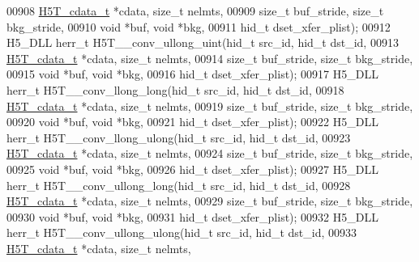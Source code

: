 \begin{DoxyCode}
00908                    \hyperlink{struct_h5_t__cdata__t}{H5T\_cdata\_t} *cdata, \textcolor{keywordtype}{size\_t} nelmts,
00909                    \textcolor{keywordtype}{size\_t} buf\_stride, \textcolor{keywordtype}{size\_t} bkg\_stride,
00910                                    \textcolor{keywordtype}{void} *buf, \textcolor{keywordtype}{void} *bkg,
00911                                    hid\_t dset\_xfer\_plist);
00912 H5\_DLL herr\_t H5T\_\_conv\_ullong\_uint(hid\_t src\_id, hid\_t dst\_id,
00913                     \hyperlink{struct_h5_t__cdata__t}{H5T\_cdata\_t} *cdata, \textcolor{keywordtype}{size\_t} nelmts,
00914                     \textcolor{keywordtype}{size\_t} buf\_stride, \textcolor{keywordtype}{size\_t} bkg\_stride,
00915                                     \textcolor{keywordtype}{void} *buf, \textcolor{keywordtype}{void} *bkg,
00916                                     hid\_t dset\_xfer\_plist);
00917 H5\_DLL herr\_t H5T\_\_conv\_llong\_long(hid\_t src\_id, hid\_t dst\_id,
00918                    \hyperlink{struct_h5_t__cdata__t}{H5T\_cdata\_t} *cdata, \textcolor{keywordtype}{size\_t} nelmts,
00919                    \textcolor{keywordtype}{size\_t} buf\_stride, \textcolor{keywordtype}{size\_t} bkg\_stride,
00920                                    \textcolor{keywordtype}{void} *buf, \textcolor{keywordtype}{void} *bkg,
00921                                    hid\_t dset\_xfer\_plist);
00922 H5\_DLL herr\_t H5T\_\_conv\_llong\_ulong(hid\_t src\_id, hid\_t dst\_id,
00923                     \hyperlink{struct_h5_t__cdata__t}{H5T\_cdata\_t} *cdata, \textcolor{keywordtype}{size\_t} nelmts,
00924                     \textcolor{keywordtype}{size\_t} buf\_stride, \textcolor{keywordtype}{size\_t} bkg\_stride,
00925                                     \textcolor{keywordtype}{void} *buf, \textcolor{keywordtype}{void} *bkg,
00926                                     hid\_t dset\_xfer\_plist);
00927 H5\_DLL herr\_t H5T\_\_conv\_ullong\_long(hid\_t src\_id, hid\_t dst\_id,
00928                     \hyperlink{struct_h5_t__cdata__t}{H5T\_cdata\_t} *cdata, \textcolor{keywordtype}{size\_t} nelmts,
00929                     \textcolor{keywordtype}{size\_t} buf\_stride, \textcolor{keywordtype}{size\_t} bkg\_stride,
00930                                     \textcolor{keywordtype}{void} *buf, \textcolor{keywordtype}{void} *bkg,
00931                                     hid\_t dset\_xfer\_plist);
00932 H5\_DLL herr\_t H5T\_\_conv\_ullong\_ulong(hid\_t src\_id, hid\_t dst\_id,
00933                      \hyperlink{struct_h5_t__cdata__t}{H5T\_cdata\_t} *cdata, \textcolor{keywordtype}{size\_t} nelmts,

\end{DoxyCode}
